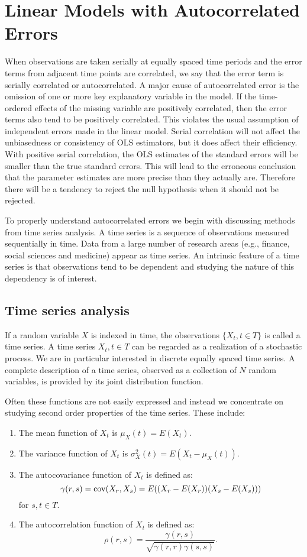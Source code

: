 \section{Linear Models with Autocorrelated Errors}

When observations are taken serially at equally spaced time periods and  the error terms from adjacent time points are correlated, we say that the error term is serially correlated or autocorrelated.  A major cause of autocorrelated error is the omission of one or more key explanatory variable in the model.
If the time-ordered effects of the missing variable are positively correlated, then the error terms also tend to be positively correlated.
This violates the usual assumption of independent errors made in the linear model. 
Serial correlation will not affect the unbiasedness or consistency of OLS estimators, but it does affect their efficiency. With positive serial correlation, the OLS estimates of the standard errors will be smaller than the true standard errors. This will lead to the erroneous conclusion that the parameter estimates are more precise than they actually are. Therefore there will be a tendency to reject the null hypothesis when it should not be rejected. 

To properly understand autocorrelated errors we begin with discussing methods from time series analysis.
A time series is a sequence of observations measured sequentially in time. Data from a large number of research areas (e.g., finance, social sciences and medicine) appear as time series. An intrinsic feature of a time series is that observations tend to be dependent and studying the nature of this dependency is of interest.

\subsection{Time series analysis}

If a random variable $X$ is indexed in time, the observations $\{X_t, t \in T\}$ is called a time series. A time series ${X_t, t \in T}$ can be regarded as a realization of a stochastic process. We are in particular interested in discrete equally spaced time series.
A complete description of a time series, observed as a collection of $N$ random variables, is provided by its joint distribution function.

Often these functions are not easily expressed  and instead we concentrate on studying second order properties of the time series.  
These include:
\begin{enumerate}
\item The mean function of $X_t$ is $\mu_X(t) = E(X_t)$. 
\item The variance function of $X_t$ is $\sigma_X^2(t) = E(X_t - \mu_X(t))$. 
\item The autocovariance function of $X_t$ is defined as:
$$
\gamma(r,s) = \mathrm{cov}(X_r,X_s) = E((X_r - E(X_r))(X_s - E(X_s)))
$$
for $s, t \in T$.

\item The autocorrelation function of $X_t$ is defined as:
$$
\rho(r,s) = \frac{\gamma(r,s)}{\sqrt{\gamma(r,r) \gamma(s,s)}}.
$$
\end{enumerate}



